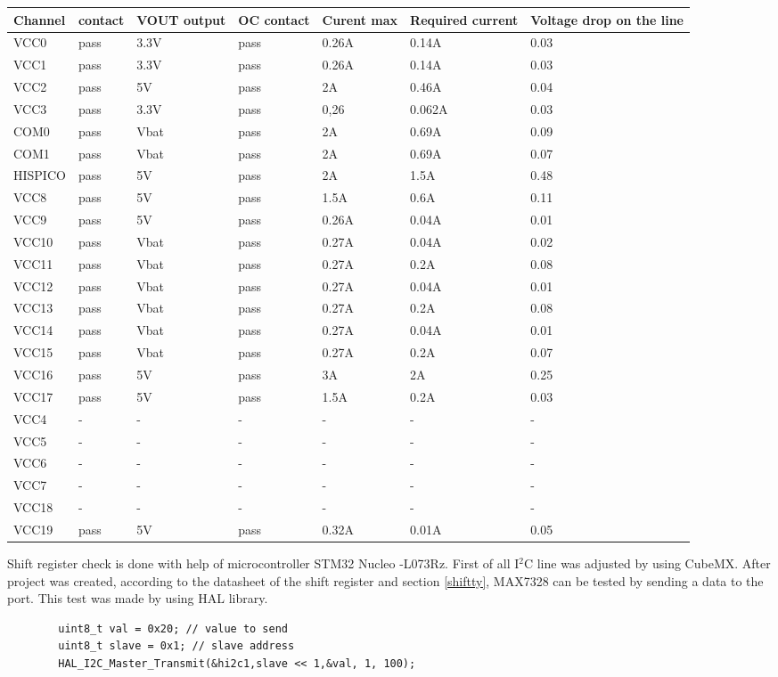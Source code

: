 			\begin{tabular}{p{2cm}p{2cm}p{2cm}p{2cm}p{2cm}p{2cm}p{3cm}}
				\toprule
				
				
				Channel & contact & VOUT output & OC contact & Curent max & Required current & Voltage drop on the line \\ \midrule
				VCC0 & pass & 3.3V & pass & 0.26A & 0.14A & 0.03 \\ 
				VCC1 & pass & 3.3V & pass & 0.26A & 0.14A & 0.03 \\ 
				VCC2 & pass & 5V & pass & 2A & 0.46A & 0.04 \\ 
				VCC3 & pass & 3.3V & pass & 0,26 & 0.062A & 0.03 \\ 
				COM0 & pass & Vbat & pass & 2A & 0.69A & 0.09 \\ 
				COM1 & pass & Vbat & pass & 2A & 0.69A & 0.07 \\ 
				HISPICO & pass & 5V & pass & 2A & 1.5A & 0.48 \\ 
				VCC8 & pass & 5V & pass & 1.5A & 0.6A & 0.11 \\ 
				VCC9 & pass & 5V & pass & 0.26A & 0.04A & 0.01 \\ 
				VCC10 & pass & Vbat & pass & 0.27A & 0.04A & 0.02 \\ 
				VCC11 & pass & Vbat & pass & 0.27A & 0.2A & 0.08 \\ 
				VCC12 & pass & Vbat & pass & 0.27A & 0.04A & 0.01 \\ 
				VCC13 & pass & Vbat & pass & 0.27A & 0.2A & 0.08 \\ 
				VCC14 & pass & Vbat & pass & 0.27A & 0.04A & 0.01 \\ 
				VCC15 & pass & Vbat & pass & 0.27A & 0.2A & 0.07 \\ 
				VCC16 & pass & 5V & pass & 3A & 2A & 0.25 \\ 
				VCC17 & pass & 5V & pass & 1.5A & 0.2A & 0.03 \\ 
				VCC4 &  - &  - &  - &  - &  - &  - \\ 
				VCC5 &  - &  - &  - &  - &  - &  - \\ 
				VCC6 &  - &  - &  - &  - &  - &  - \\ 
				VCC7 &  - &  - &  - &  - &  - &  - \\ 
				VCC18 &  - &  - &  - &  - &  - &  - \\ 
				VCC19 & pass & 5V & pass & 0.32A & 0.01A & 0.05 \\ 
				\bottomrule
			\end{tabular}
			\label{switchtest}
		
		
		Shift register check is done with help of microcontroller STM32 Nucleo -L073Rz. First of all I$^2$C line was adjusted by using CubeMX. After project was created, according to the datasheet of the shift register and section \ref{shiftty}, MAX7328 can be tested by sending a data to the port. This test was made by using HAL library.\\
		\begin{lstlisting}
		uint8_t val = 0x20; // value to send
		uint8_t slave = 0x1; // slave address
		HAL_I2C_Master_Transmit(&hi2c1,slave << 1,&val, 1, 100);
		\end{lstlisting}
	
